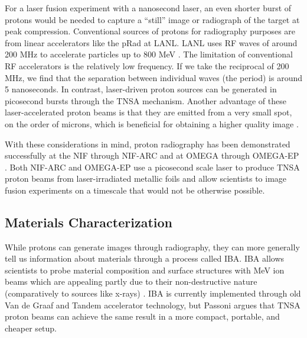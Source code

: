 For a laser fusion experiment with a nanosecond laser, an even shorter burst of protons would be needed to capture a ``still'' image or radiograph of the target at peak compression. Conventional sources of protons for radiography purposes are from linear accelerators like the pRad at \gls{LANL}. \gls{LANL} uses \gls{RF} waves of around 200 MHz to accelerate particles up to 800 MeV \cite{LANL_PRAD}. The limitation of conventional \gls{RF} accelerators is the relatively low frequency. If we take the reciprocal of 200 MHz, we find that the separation between individual waves (the period) is around 5 nanoseconds. In contrast, laser-driven proton sources can be generated in picosecond bursts through the \gls{TNSA} mechanism. Another advantage of these laser-accelerated proton beams is that they are emitted from a very small spot, on the order of microns, which is beneficial for obtaining a higher quality image \cite{Schaeffer_2023_RevMod}.

With these considerations in mind, proton radiography has been demonstrated successfully at the \gls{NIF} through \gls{NIF-ARC} \cite{Simpson_2021_PPCF} and at OMEGA through \gls{OMEGA-EP} \cite{Zylstra_2012_RSI}. Both \gls{NIF-ARC} and \gls{OMEGA-EP} use a picosecond scale laser to produce \gls{TNSA} proton beams from laser-irradiated metallic foils and allow scientists to image fusion experiments on a timescale that would not be otherwise possible.

\subsection{Materials Characterization}

While protons can generate images through radiography, they can more generally tell us information about materials through a process called \gls{IBA}. \gls{IBA} allows scientists to probe material composition and surface structures with MeV ion beams which are appealing partly due to their non-destructive nature (comparatively to sources like x-rays) \cite{Passoni_2019_SciRep}. \gls{IBA} is currently implemented through old Van de Graaf and Tandem accelerator technology, but Passoni \cite{Passoni_2019_SciRep} argues that \gls{TNSA} proton beams can achieve the same result in a more compact, portable, and cheaper setup.

